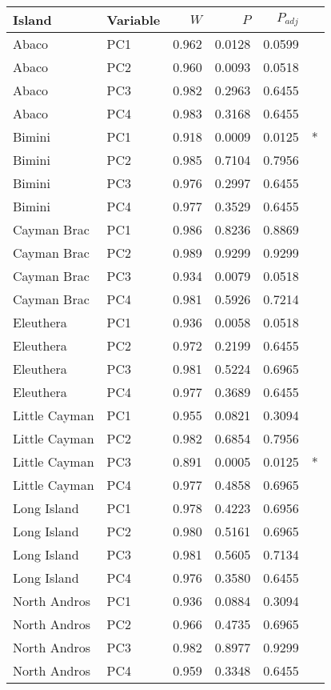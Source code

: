 
\begin{tabular}{llrrrl}
\toprule
Island & Variable & $W$ & $P$ & $P_{adj}$ & \\
\midrule
Abaco & PC1 & 0.962 & 0.0128 & 0.0599 & \\
Abaco & PC2 & 0.960 & 0.0093 & 0.0518 & \\
Abaco & PC3 & 0.982 & 0.2963 & 0.6455 & \\
Abaco & PC4 & 0.983 & 0.3168 & 0.6455 & \\
Bimini & PC1 & 0.918 & 0.0009 & 0.0125 & *\\
Bimini & PC2 & 0.985 & 0.7104 & 0.7956 & \\
Bimini & PC3 & 0.976 & 0.2997 & 0.6455 & \\
Bimini & PC4 & 0.977 & 0.3529 & 0.6455 & \\
Cayman Brac & PC1 & 0.986 & 0.8236 & 0.8869 & \\
Cayman Brac & PC2 & 0.989 & 0.9299 & 0.9299 & \\
Cayman Brac & PC3 & 0.934 & 0.0079 & 0.0518 & \\
Cayman Brac & PC4 & 0.981 & 0.5926 & 0.7214 & \\
Eleuthera & PC1 & 0.936 & 0.0058 & 0.0518 & \\
Eleuthera & PC2 & 0.972 & 0.2199 & 0.6455 & \\
Eleuthera & PC3 & 0.981 & 0.5224 & 0.6965 & \\
Eleuthera & PC4 & 0.977 & 0.3689 & 0.6455 & \\
Little Cayman & PC1 & 0.955 & 0.0821 & 0.3094 & \\
Little Cayman & PC2 & 0.982 & 0.6854 & 0.7956 & \\
Little Cayman & PC3 & 0.891 & 0.0005 & 0.0125 & *\\
Little Cayman & PC4 & 0.977 & 0.4858 & 0.6965 & \\
Long Island & PC1 & 0.978 & 0.4223 & 0.6956 & \\
Long Island & PC2 & 0.980 & 0.5161 & 0.6965 & \\
Long Island & PC3 & 0.981 & 0.5605 & 0.7134 & \\
Long Island & PC4 & 0.976 & 0.3580 & 0.6455 & \\
North Andros & PC1 & 0.936 & 0.0884 & 0.3094 & \\
North Andros & PC2 & 0.966 & 0.4735 & 0.6965 & \\
North Andros & PC3 & 0.982 & 0.8977 & 0.9299 & \\
North Andros & PC4 & 0.959 & 0.3348 & 0.6455 & \\
\bottomrule
\end{tabular}